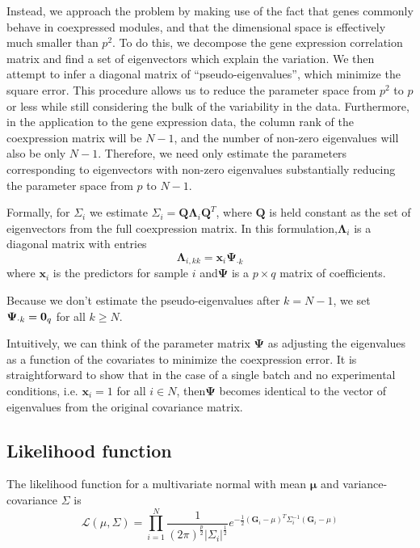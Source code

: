 Instead, we approach the problem by making use of the fact that genes
commonly behave in coexpressed modules, and that the dimensional space
is effectively much smaller than $p^{2}$. To do this, we decompose
the gene expression correlation matrix and find a set of eigenvectors
which explain the variation. We then attempt to infer a diagonal matrix
of ``pseudo-eigenvalues'', which minimize the square error. This
procedure allows us to reduce the parameter space from $p^{2}$ to
$p$ or less while still considering the bulk of the variability in
the data. Furthermore, in the application to the gene expression data,
the column rank of the coexpression matrix will be $N-1$, and the
number of non-zero eigenvalues will also be only $N-1$. Therefore,
we need only estimate the parameters corresponding to eigenvectors
with non-zero eigenvalues substantially reducing the parameter space
from $p$ to $N-1$.

Formally, for $\Sigma_{i}$ we estimate $\Sigma_{i}=\mathbf{Q}\mathbf{\Lambda}_{i}\mathbf{Q}^{T}$,
where $\mathbf{Q}$ is held constant as the set of eigenvectors from
the full coexpression matrix. In this formulation,$\mathbf{\Lambda}_{i}$
is a diagonal matrix with entries 
\begin{equation}
\mathbf{\Lambda}_{i,kk}=\mathbf{x}_{i}\mathbf{\Psi}_{\cdot k}\label{eq:Lambda_diag}
\end{equation}
 where $\mathbf{x}_{i}$ is the predictors for sample $i$ and$\mathbf{\Psi}$
is a $p\times q$ matrix of coefficients. 

Because we don't estimate the pseudo-eigenvalues after $k=N-1$, we
set $\mathbf{\Psi}_{\cdot k}=\text{\ensuremath{\mathbf{0}}}_{q}$
for all $k\ge N$. 

Intuitively, we can think of the parameter matrix $\mathbf{\Psi}$
as adjusting the eigenvalues as a function of the covariates to minimize
the coexpression error. It is straightforward to show that in the
case of a single batch and no experimental conditions, i.e. $\mathbf{x}_{i}=1$
for all $i\in N$, then$\mathbf{\Psi}$ becomes identical to the vector
of eigenvalues from the original covariance matrix.

\subsection{Likelihood function}

The likelihood function for a multivariate normal with mean $\mathbf{\mu}$
and variance-covariance $\Sigma$ is 
\[
\mathcal{L}\left(\mu,\Sigma\right)=\prod_{i=1}^{N}\frac{1}{\left(2\pi\right)^{\frac{p}{2}}|\Sigma_{i}|^{\frac{1}{2}}}e^{-\frac{1}{2}\left(\mathbf{G}_{i}-\mu\right)^{T}\Sigma_{i}^{-1}\left(\mathbf{G}_{i}-\mu\right)}
\]

